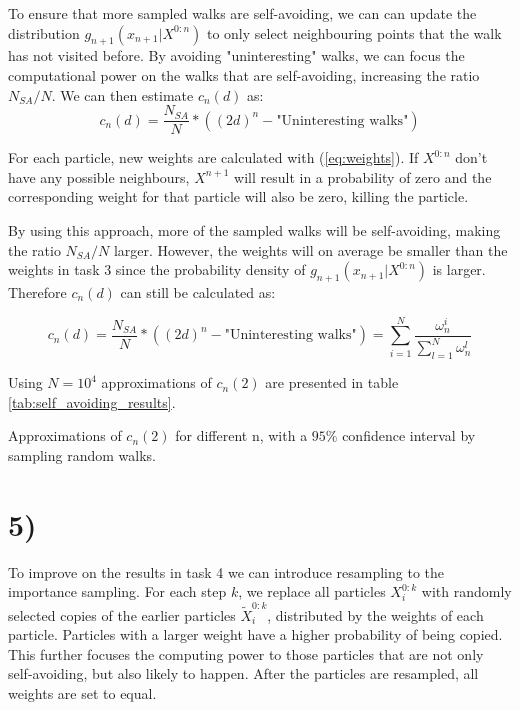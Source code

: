 \documentclass[a4paper]{article}
\begin{document}
To ensure that more sampled walks are self-avoiding, we can can update the distribution $g_{n+1}(x_{n+1}|X^{0:n})$ to only select neighbouring points that the walk has not visited before. By avoiding "uninteresting" walks, we can focus the computational power on the walks that are self-avoiding, increasing the ratio $N_{SA}/N$. We can then estimate $c_n(d)$ as:
\begin{equation}
    c_n(d) = \frac{N_{SA}}{N} * ((2d)^n - \text{"Uninteresting walks"})
\end{equation}

For each particle, new weights are calculated with (\ref{eq:weights}). If $X^{0:n}$ don't have any possible neighbours, $X^{n+1}$ will result in a probability of zero and the corresponding weight for that particle will also be zero, killing the particle.

By using this approach, more of the sampled walks will be self-avoiding, making the ratio $N_{SA}/N$ larger. However, the weights will on average be smaller than the weights in task 3 since the probability density of $g_{n+1}(x_{n+1}|X^{0:n})$ is larger. Therefore $c_n(d)$ can still be calculated as:

\begin{equation}
    c_n(d) = \frac{N_{SA}}{N} * ((2d)^n - \text{"Uninteresting walks"}) = \sum_{i = 1}^N\frac{\omega_n^i}{\sum_{l=1}^N\omega_n^l}
\end{equation}

Using $N = 10^4$ approximations of $c_n(2)$ are presented in table \ref{tab:self_avoiding_results}.

\begin{table}[H]
    \centering
    \caption{Approximations of $c_n(2)$ for different n, with a $95\%$ confidence interval by sampling random walks.}
    \label{tab:self_avoiding_results}
    
\end{table}

\section*{5)}
To improve on the results in task 4 we can introduce resampling to the importance sampling. For each step $k$, we replace all particles $X_i^{0:k}$ with randomly selected copies of the earlier particles $\widetilde{X}_i^{0:k}$, distributed by the weights of each particle. Particles with a larger weight have a higher probability of being copied. This further focuses the computing power to those particles that are not only self-avoiding, but also likely to happen. After the particles are resampled, all weights are set to equal.
\end{document}

